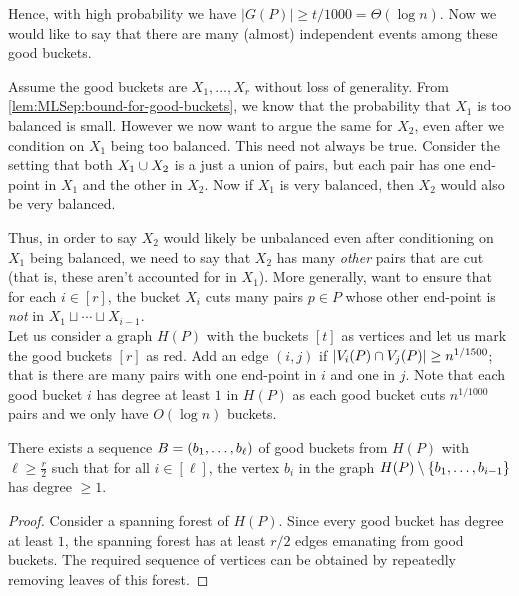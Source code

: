 Hence, with high probability we have $|G(P)| \geq t/1000 = \Theta(\log n)$.
Now we would like to say that there are many (almost) independent events among these good buckets.

Assume the good buckets are $X_1,\ldots,X_{r}$ without loss of generality.
From \autoref{lem:MLSep:bound-for-good-buckets}, we know that the probability that $X_1$ is too balanced is small.
However we now want to argue the same for $X_2$, even after we condition on $X_1$ being too balanced.
This need not always be true.
Consider the setting that both $X_1 \cup X_2$ is a just a union of pairs, but each pair has one end-point in $X_1$ and the other in $X_2$.
Now if $X_1$ is very balanced, then $X_2$ would also be very balanced.

Thus, in order to say $X_2$ would likely be unbalanced even after conditioning on $X_1$ being balanced, we need to say that $X_2$ has many \emph{other} pairs that are cut (that is, these aren't accounted for in $X_1$).
More generally, want to ensure that for each $i \in [r]$, the bucket $X_i$ cuts many pairs $p \in P$ whose other end-point is \emph{not} in $X_1 \sqcup \cdots \sqcup X_{i-1}$.\\

Let us consider a graph $H(P)$ with the buckets $[t]$ as vertices and let us mark the good buckets $[r]$ as red.
Add an edge $(i,j)$ if $\left|V_i(P) \cap V_j(P)\right| \geq n^{1/1500}$; that is there are many pairs with one end-point in $i$ and one in $j$.
Note that each good bucket $i$ has degree at least $1$ in $H(P)$ as each good bucket cuts $n^{1/1000}$ pairs and we only have $O(\log n)$ buckets.

\begin{lemma}
\label{lem:halfVerticesIndep}
There exists a sequence $B=\left(b_1,\ldots,b_\ell\right)$ of good buckets from $H(P)$ with  $\ell \geq \frac{r}{2}$ such that for all $i \in [\ell]$, the vertex $b_i$ in the graph $H(P) \setminus \left\{b_1,\ldots, b_{i-1}\right\}$ has degree $\geq 1$.
\end{lemma}
\begin{proof}
  Consider a spanning forest of $H(P)$.
Since every good bucket has degree at least $1$, the spanning forest has at least $r/2$ edges emanating from good buckets.
The required sequence of vertices can be obtained by repeatedly removing leaves of this forest.
\end{proof}


